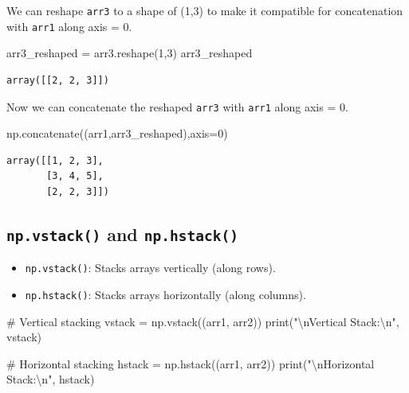 \documentclass[
  letterpaper,
  DIV=11,
  numbers=noendperiod]{scrreprt}
\newenvironment{Shaded}{\begin{snugshade}}{\end{snugshade}}
\newcommand{\BuiltInTok}[1]{\textcolor[rgb]{0.00,0.23,0.31}{#1}}
\newcommand{\CharTok}[1]{\textcolor[rgb]{0.13,0.47,0.30}{#1}}
\newcommand{\CommentTok}[1]{\textcolor[rgb]{0.37,0.37,0.37}{#1}}
\newcommand{\DecValTok}[1]{\textcolor[rgb]{0.68,0.00,0.00}{#1}}
\newcommand{\NormalTok}[1]{\textcolor[rgb]{0.00,0.23,0.31}{#1}}
\newcommand{\OperatorTok}[1]{\textcolor[rgb]{0.37,0.37,0.37}{#1}}
\newcommand{\StringTok}[1]{\textcolor[rgb]{0.13,0.47,0.30}{#1}}
\providecommand{\tightlist}{%
  \setlength{\itemsep}{0pt}\setlength{\parskip}{0pt}}\usepackage{longtable,booktabs,array}
\begin{document}
We can reshape \texttt{arr3} to a shape of (1,3) to make it compatible
for concatenation with \texttt{arr1} along axis = 0.

\begin{Shaded}
\begin{Highlighting}[]
\NormalTok{arr3\_reshaped }\OperatorTok{=}\NormalTok{ arr3.reshape(}\DecValTok{1}\NormalTok{,}\DecValTok{3}\NormalTok{)}
\NormalTok{arr3\_reshaped}
\end{Highlighting}
\end{Shaded}

\begin{verbatim}
array([[2, 2, 3]])
\end{verbatim}

Now we can concatenate the reshaped \texttt{arr3} with \texttt{arr1}
along axis = 0.

\begin{Shaded}
\begin{Highlighting}[]
\NormalTok{np.concatenate((arr1,arr3\_reshaped),axis}\OperatorTok{=}\DecValTok{0}\NormalTok{)}
\end{Highlighting}
\end{Shaded}

\begin{verbatim}
array([[1, 2, 3],
       [3, 4, 5],
       [2, 2, 3]])
\end{verbatim}

\hypertarget{np.vstack-and-np.hstack}{%
\subsection{\texorpdfstring{\texttt{np.vstack()} and
\texttt{np.hstack()}}{np.vstack() and np.hstack()}}\label{np.vstack-and-np.hstack}}

\begin{itemize}
\tightlist
\item
  \texttt{np.vstack()}: Stacks arrays vertically (along rows).
\item
  \texttt{np.hstack()}: Stacks arrays horizontally (along columns).
\end{itemize}

\begin{Shaded}
\begin{Highlighting}[]
\CommentTok{\# Vertical stacking}
\NormalTok{vstack }\OperatorTok{=}\NormalTok{ np.vstack((arr1, arr2))}
\BuiltInTok{print}\NormalTok{(}\StringTok{"}\CharTok{\textbackslash{}n}\StringTok{Vertical Stack:}\CharTok{\textbackslash{}n}\StringTok{"}\NormalTok{, vstack)}

\CommentTok{\# Horizontal stacking}
\NormalTok{hstack }\OperatorTok{=}\NormalTok{ np.hstack((arr1, arr2))}
\BuiltInTok{print}\NormalTok{(}\StringTok{"}\CharTok{\textbackslash{}n}\StringTok{Horizontal Stack:}\CharTok{\textbackslash{}n}\StringTok{"}\NormalTok{, hstack)}
\end{Highlighting}
\end{Shaded}
\end{document}
